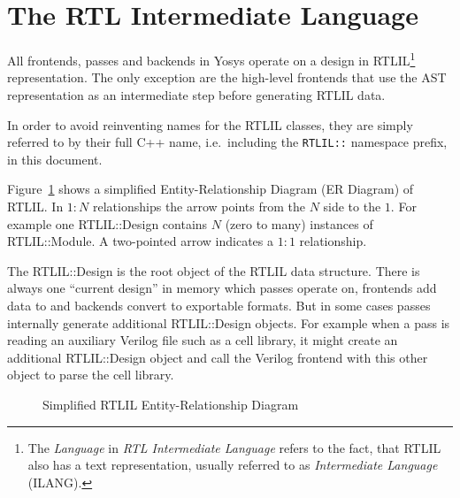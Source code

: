 \section{The RTL Intermediate Language}

All frontends, passes and backends in Yosys operate on a design in RTLIL\footnote{The {\it Language} in {\it RTL Intermediate Language}
refers to the fact, that RTLIL also has a text representation, usually referred to as {\it Intermediate Language} (ILANG).} representation.
The only exception are the high-level frontends that use the AST representation as an intermediate step before generating RTLIL
data.

In order to avoid reinventing names for the RTLIL classes, they are simply referred to by their full C++ name, i.e.~including
the {\tt RTLIL::} namespace prefix, in this document.

Figure~\ref{fig:Overview_RTLIL} shows a simplified Entity-Relationship Diagram (ER Diagram) of RTLIL. In $1:N$ relationships the arrow
points from the $N$ side to the $1$. For example one RTLIL::Design contains $N$ (zero to many) instances of RTLIL::Module.
A two-pointed arrow indicates a $1:1$ relationship.

The RTLIL::Design is the root object of the RTLIL data structure. There is always one ``current design'' in memory
which passes operate on, frontends add data to and backends convert to exportable formats. But in some cases passes
internally generate additional RTLIL::Design objects. For example when a pass is reading an auxiliary Verilog file such
as a cell library, it might create an additional RTLIL::Design object and call the Verilog frontend with this
other object to parse the cell library.

\begin{figure}[t]
	\hfil
	\caption{Simplified RTLIL Entity-Relationship Diagram}
	\label{fig:Overview_RTLIL}
\end{figure}

